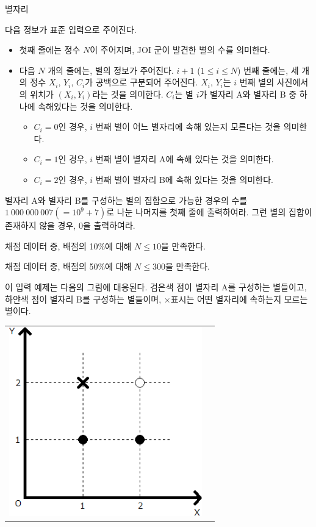 \begin{problem}{별자리}
	
	\InputFile
	
	다음 정보가 표준 입력으로 주어진다.
	
	\begin{itemize}
		\item 첫째 줄에는 정수 $N$이 주어지며, JOI 군이 발견한 별의 수를 의미한다.
		\item 다음 $N$ 개의 줄에는, 별의 정보가 주어진다. $i+1$ ($1 \le i \le N$) 번째 줄에는, 세 개의 정수 $X_i$, $Y_i$, $C_i$가 공백으로 구분되어 주어진다. $X_i$, $Y_i$는 $i$ 번째 별의 사진에서의 위치가 $(X_i, Y_i)$라는 것을 의미한다. $C_i$는 별 $i$가 별자리 A와 별자리 B 중 하나에 속해있다는 것을 의미한다.
		\begin{itemize}
			\item $C_i=0$인 경우, $i$ 번째 별이 어느 별자리에 속해 있는지 모른다는 것을 의미한다.
			\item $C_i=1$인 경우, $i$ 번째 별이 별자리 A에 속해 있다는 것을 의미한다.
			\item $C_i=2$인 경우, $i$ 번째 별이 별자리 B에 속해 있다는 것을 의미한다.
		\end{itemize}
	\end{itemize}
	
	
	\OutputFile
	
	별자리 A와 별자리 B를 구성하는 별의 집합으로 가능한 경우의 수를 $1\ 000\ 000\ 007 (=10^9 + 7)$로 나눈 나머지를 첫째 줄에 출력하여라. 그런 별의 집합이 존재하지 않을 경우, 0을 출력하여라.
	
	\Scoring
	
	채점 데이터 중, 배점의 10\%에 대해 $N \le 10$을 만족한다.
	
	채점 데이터 중, 배점의 50\%에 대해 $N \le 300$을 만족한다.
	
	\Examples
	
	\begin{example}
	\end{example}
	
	이 입력 예제는 다음의 그림에 대응된다. 검은색 점이 별자리 A를 구성하는 별들이고, 하얀색 점이 별자리 B를 구성하는 별들이며, $\times$표시는 어떤 별자리에 속하는지 모르는 별이다.
	
	\begin{center}
	\begin{tabular}{cc}	
	\includegraphics[width=0.4\linewidth]{img1.png} &  \hspace{0.45\linewidth} \\
	\end{tabular}
	\end{center}
	

\end{problem}
